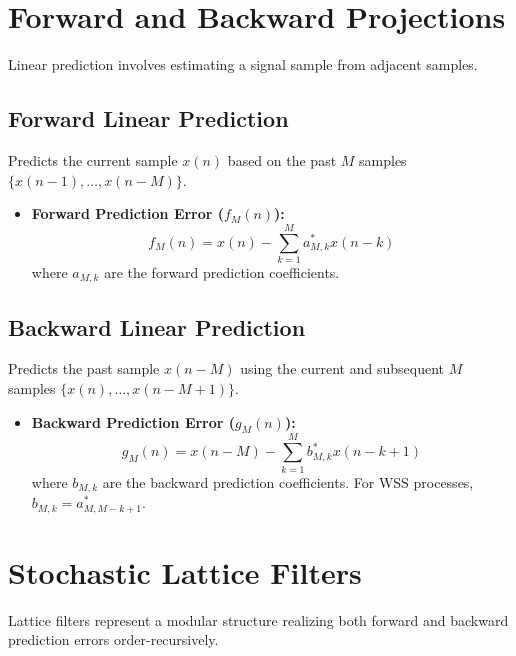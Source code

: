 \documentclass[12pt,a4paper]{article}
\begin{document}
\section{Forward and Backward Projections}

Linear prediction involves estimating a signal sample from adjacent samples.

\subsection{Forward Linear Prediction}
Predicts the current sample $x(n)$ based on the past $M$ samples $\{x(n-1), \dots, x(n-M)\}$.
\begin{itemize}[leftmargin=*, itemsep=2pt]
  \item \textbf{Forward Prediction Error ($f_M(n)$):}
  \begin{equation}
    f_M(n) = x(n) - \sum_{k=1}^M a_{M,k}^* x(n-k)
  \end{equation}
  where $a_{M,k}$ are the forward prediction coefficients.
\end{itemize}

\subsection{Backward Linear Prediction}
Predicts the past sample $x(n-M)$ using the current and subsequent $M$ samples $\{x(n), \dots, x(n-M+1)\}$.
\begin{itemize}[leftmargin=*, itemsep=2pt]
  \item \textbf{Backward Prediction Error ($g_M(n)$):}
  \begin{equation}
    g_M(n) = x(n-M) - \sum_{k=1}^M b_{M,k}^* x(n-k+1)
  \end{equation}
  where $b_{M,k}$ are the backward prediction coefficients. For WSS processes, $b_{M,k} = a_{M, M-k+1}^*$.
\end{itemize}

\section{Stochastic Lattice Filters}

Lattice filters represent a modular structure realizing both forward and backward prediction errors order-recursively.
\end{document}
